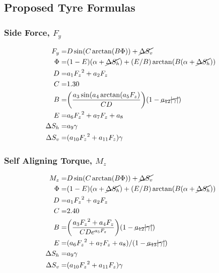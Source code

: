 \documentclass[12pt]{article}
\begin{document}
\subsection{Proposed Tyre Formulas}
\subsubsection{Side Force, $F_y$}
\begin{subequations}
	\begin{align}
		\label{eqn:tire_model_side_force}  
		F_y =& D\sin(C\arctan(B\Phi))  + \cancel{\Delta{S_v}} \\
		\Phi =& (1-E)(\alpha+\cancel{\Delta{S_h}})+(E/B)\arctan(B(\alpha+\cancel{\Delta{S_h}})) \\
		D =& a_1{F_z}^2 + a_2{F_z}\\
		C =& 1.30 \\
		B =& \bigg(\frac{a_3\sin(a_4\arctan(a_5F_z)}{CD}\bigg)(1-\cancel{a_{12}|\gamma|})\\
		E =& a_6{F_z}^{2} + a_7{F_z} + a_8 \\
		\Delta{S_h} =& a_9\gamma \\
		\Delta{S_v} =& (a_{10}{F_z}^{2}+ a_{11}F_z)\gamma
	\end{align}
\end{subequations} 
\subsubsection{Self Aligning Torque, $M_z$}
\begin{subequations}
	\begin{align}
	\label{eqn:tire_model_self_aligning_torque}  
	M_z =& D\sin(C\arctan(B\Phi))  + \cancel{\Delta{S_v}} \\
	\Phi =& (1-E)(\alpha+\cancel{\Delta{S_h}})+(E/B)\arctan(B(\alpha+\cancel{\Delta{S_h}})) \\
	D =& a_1{F_z}^2 + a_2{F_z}\\
	C =& 2.40 \\
	B =& \bigg(\frac{a_3{F_z}^2+a_4F_z}{CDe^{a_5{F_z}}}\bigg)(1-\cancel{a_{12}|\gamma|})\\
	E =& (a_6{F_z}^{2} + a_7{F_z} + a_8)/(1-\cancel{a_{13}|\gamma|}) \\
	\Delta{S_h} =& a_9\gamma \\
	\Delta{S_v} =& (a_{10}{F_z}^{2}+ a_{11}F_z)\gamma
	\end{align}
\end{subequations}
\end{document}
